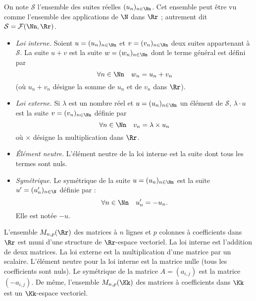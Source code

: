 \documentclass[class=report,crop=false]{standalone}
\begin{document}
\begin{exemple}
On note $\mathcal{S}$ l'ensemble des suites réelles $(u_n)_{n\in \Nn}$.
Cet ensemble peut être vu comme l'ensemble des applications de $\N$ dans $\Rr$ ;
autrement dit $\mathcal{S} = \mathcal{F}(\Nn, \Rr)$.

\begin{itemize}
  \item  \emph{Loi interne.}
Soient $u=(u_n)_{n \in \Nn}$ et $v=(v_n)_{n \in \Nn}$ deux suites appartenant à $\mathcal{S}$.
La suite $u+v$ est la suite $w=(w_n)_{n \in \Nn}$ dont le terme général est défini par
$$\forall n \in \Nn \quad w_n=u_n+v_n$$
(où $u_n+v_n$ désigne la somme de $u_n$ et de $v_n$ dans $\Rr$).

  \item \emph{Loi externe.}
Si $\lambda$ est un nombre réel et $u=(u_n)_{n \in \Nn}$ un élément de $\mathcal{S}$,
$\lambda \cdot u$ est la suite
 $v=(v_n)_{n \in \Nn}$ définie par
 $$\forall n \in \Nn \quad  v_n=\lambda \times u_n$$
 où $\times$ désigne la multiplication dans $\Rr$.

  \item \emph{\'Elément neutre.}
  L'élément neutre de la loi interne est la suite dont tous les termes sont nuls.

  \item \emph{Symétrique.}
  Le symétrique de la suite $u=(u_n)_{n \in \Nn}$ est la suite $u'=(u'_n)_{n \in \N}$ définie par :
 $$\forall n \in \Nn \quad u'_n=-u_n.$$
 Elle est notée $-u$.
\end{itemize}
\end{exemple}



\begin{exemple}
L'ensemble $M_{n,p}(\Rr)$ des matrices à $n$ lignes et $p$ colonnes à coefficients
dans $\Rr$ est muni d'une structure de $\Rr$-espace vectoriel.
La loi interne est l'addition de deux matrices.
La loi externe est la multiplication d'une matrice par un scalaire.
 L'élément neutre pour la loi interne est la matrice nulle (tous les coefficients sont nuls).
 Le symétrique de la matrice $A=(a_{i,j})$ est la matrice
 $(-a_{i,j})$. De même, l'ensemble $M_{n,p}(\Kk)$ des matrices à coefficients
dans $\Kk$ est un $\Kk$-espace vectoriel.
\end{exemple}
\end{document}
